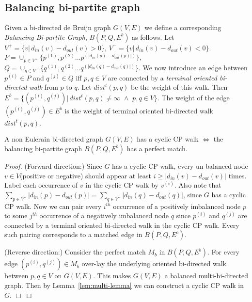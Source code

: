 \documentclass[runningheads]{llncs}
\begin{document}
\subsection{Balancing bi-partite graph}
\label{sec:bal-bi-graph}
Given a bi-directed de Bruijn graph $G(V,E)$ we define a corresponding {\em Balancing Bi-partite Graph},
$B(P,Q,E^b)$ as follows. Let $V^+=\{ v |\,d_{in}(v) - d_{out}(v) > 0\}$, 
$V^- = \{ v |\,d_{in}(v) - d_{out}(v) < 0\}$. 
$P = \cup_{p\in V^+} \{p^{(1)},p^{(2)}\ldots p^{(|d_{in}(p)-d_{out}(p)|)}\}$, 
$Q = \cup_{q\in V^-}\{q^{(1)}, q^{(2)} \ldots q^{(|d_{in}(q)-d_{out}(q)|)}\}$. We now introduce an 
edge between $p^(i) \in P$ and $q^(j) \in Q$ iff $p,q \in V$ are connected by a {\em terminal oriented
bi-directed walk} from $p$ to $q$. Let $dist^t(p,q)$ be the weight of
this walk. Then $E^b = \{(p^{(i)}, q^{(j)}) |\, dist^t(p,q) \neq \infty \,\,\wedge\,\, p,q \in V\}$. The weight
of the edge $(p^{(i)},q^{(j)})\in E^b$ is the weight of terminal oriented bi-directed walk $dist^t(p,q)$.

\begin{lemma}
\label{lem:bi-match}
A non Eulerain bi-directed graph $G(V,E)$ has a cyclic CP walk $\iff$ the balancing bi-partite graph 
$B(P,Q,E^b)$ has a perfect match.
\end{lemma}
\begin{proof}
(Forward direction:) Since $G$ has a cyclic CP walk, every un-balanced node $v \in V$(positive or negative) 
should appear at least $i \geq |d_{in}(v)-d_{out}(v)|$ times. Label each occurrence of $v$ in the cyclic CP walk by $v^{(i)}$. Also note that $\sum_{p\in V^+} |d_{in}(p)-d_{out}(p)| = \sum_{q\in V^-} |d_{in}(q) - d_{out}(q)|$, 
since $G$ has a cyclic CP walk. Now we can pair every $i^{th}$ occurrence of a positively imbalanced node $p$ to some
$j^{th}$ occurrence of a negatively imbalanced node $q$ since $p^{(i)}$ and $q^{(j)}$ are connected by a terminal oriented bi-directed
walk in the cyclic CP walk. Every such pairing corresponds to a matched edge in $B(P,Q,E^b)$.

\vspace{0.1in}

\noindent(Reverse direction:) Consider the perfect match $M_b$ in $B(P,Q,E^b)$. For every edge $(p^{(i)}, q^{(j)}) \in M_b$
over-lay the underlying oriented bi-directed walk between $p,q \in V$ on $G(V,E)$. This makes $G(V,E)$ a balanced
multi-bi-directed graph. Then by Lemma~\ref{lem:multi-lemma} we can construct a cyclic CP walk in $G$. $\Box$
\end{proof}
\end{document}
